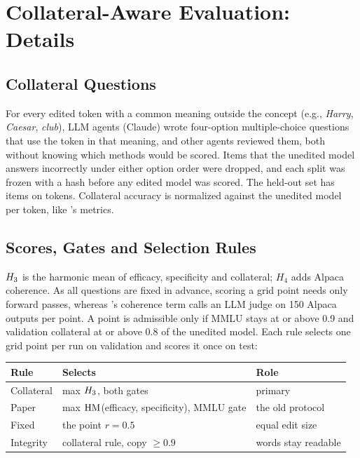 \section{Collateral-Aware Evaluation: Details}
\label{app:eval}

\subsection{Collateral Questions}
For every edited token with a common meaning outside the concept (e.g., \emph{Harry}, \emph{Caesar}, \emph{club}), LLM agents (Claude) wrote four-option multiple-choice questions that use the token in that meaning, and other agents reviewed them, both without knowing which methods would be scored.
Items that the unedited model answers incorrectly under either option order were dropped, and each split was frozen with a hash before any edited model was scored.
The held-out set has  items on  tokens.
Collateral accuracy is normalized against the unedited model per token, like \ember{}'s metrics.

\subsection{Scores, Gates and Selection Rules}
$H_{3}$ is the harmonic mean of efficacy, specificity and collateral; $H_4$ adds Alpaca coherence.
As all questions are fixed in advance, scoring a grid point needs only forward passes, whereas \ember{}'s coherence term calls an LLM judge on 150 Alpaca outputs per point.
A point is admissible only if MMLU stays at or above 0.9 and validation collateral at or above 0.8 of the unedited model.
Each rule selects one grid point per run on validation and scores it once on test:

\begin{center}
\small
\setlength{\tabcolsep}{3pt}
\begin{tabular}{@{}lP{3.4cm}l@{}}
\toprule
Rule & Selects & Role \\
\midrule
Collateral & max $H_{3}$, both gates & primary \\
Paper & max $\operatorname{HM}$(efficacy, specificity), MMLU gate & the old protocol \\
Fixed & the point $r = 0.5$ & equal edit size \\
Integrity & collateral rule, copy $\geq 0.9$ & words stay readable \\
\bottomrule
\end{tabular}
\end{center}

